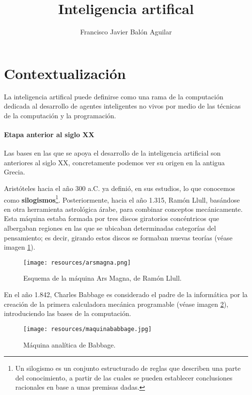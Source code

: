 \documentclass[a4paper, 11pt, titlepage]{article}
\title{Inteligencia artifical}
\author{Francisco Javier Balón Aguilar}
\begin{document}
\maketitle
\renewcommand{\contentsname}{Índice}
\tableofcontents
\newpage

\section{Contextualización}

    La inteligencia artifical puede definirse como una rama de la computación dedicada al
    desarrollo de agentes inteligentes no vivos por medio de las técnicas de la computación 
    y la programación.

    \paragraph{Etapa anterior al siglo XX} Las bases en las que se apoya el desarrollo de la inteligencia 
    artificial son anteriores al siglo XX, concretamente podemos ver su origen en la antigua Grecia.

    Aristóteles hacia el año 300 a.C. ya definió, en sus estudios, lo que conocemos como 
    \textbf{silogismos}\footnote{
        Un silogismo es un conjunto estructurado de reglas que describen una parte del conocimiento, 
        a partir de las cuales se pueden establecer conclusiones racionales en base a unas 
        premisas dadas.
    }. Posteriormente, hacia el año 1.315, Ramón Llull, basándose en otra herramienta astrológica 
    árabe, para combinar conceptos mecánicamente. Esta máquina estaba formada por tres discos 
    giratorios concéntricos que albergaban regiones en las que se ubicaban determinadas categorías 
    del pensamiento; es decir, girando estos discos se formaban nuevas teorías (véase imagen 
    \ref{arsmagna}).

    \begin{figure}[htp]
        \centering
        \texttt{[image: resources/arsmagna.png]}
        \caption{Esquema de la máquina Ars Magna, de Ramón Llull.}
        \label{arsmagna}
    \end{figure}

    En el año 1.842, Charles Babbage es considerado el padre de la informática por la creación de la 
    primera calculadora mecánica programable (véase imagen \ref{maquinabaggage}), introduciendo las bases 
    de la computación.

    \begin{figure}[htp]
        \centering
        \texttt{[image: resources/maquinababbage.jpg]}
        \caption{Máquina analítica de Babbage.}
        \label{maquinabaggage}
    \end{figure}
\end{document}
